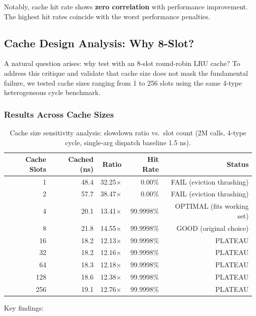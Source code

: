 \documentclass[sigplan,final]{acmart}
\begin{document}
Notably, cache hit rate shows \textbf{zero correlation} with performance improvement. The
highest hit rates coincide with the worst performance penalties.

\subsection{Cache Design Analysis: Why 8-Slot?}
\label{sec:cache-design}

A natural question arises: why test with an 8-slot round-robin LRU cache? To address this critique
and validate that cache size does not mask the fundamental failure, we tested cache sizes ranging
from 1 to 256 slots using the same 4-type heterogeneous cycle benchmark.

\subsubsection{Results Across Cache Sizes}

\begin{table}[h]
\centering
\caption{Cache size sensitivity analysis: slowdown ratio vs.~slot count (2M calls, 4-type cycle, single-arg dispatch baseline 1.5 ns).}
\label{tab:cache-size}
\begin{tabular}{@{}rrrrr@{}}
\toprule
\textbf{Cache Slots} & \textbf{Cached (ns)} & \textbf{Ratio} & \textbf{Hit Rate} & \textbf{Status} \\
\midrule
1   & 48.4  & 32.25× & 0.00\%     & FAIL (eviction thrashing) \\
2   & 57.7  & 38.47× & 0.00\%     & FAIL (eviction thrashing) \\
4   & 20.1  & 13.41× & 99.9998\%  & OPTIMAL (fits working set) \\
8   & 21.8  & 14.55× & 99.9998\%  & GOOD (original choice) \\
16  & 18.2  & 12.13× & 99.9998\%  & PLATEAU \\
32  & 18.2  & 12.16× & 99.9998\%  & PLATEAU \\
64  & 18.3  & 12.18× & 99.9998\%  & PLATEAU \\
128 & 18.6  & 12.38× & 99.9998\%  & PLATEAU \\
256 & 19.1  & 12.76× & 99.9998\%  & PLATEAU \\
\bottomrule
\end{tabular}
\end{table}

Key findings:
\end{document}
